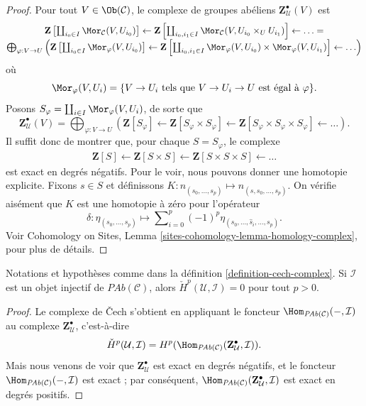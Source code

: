 \begin{proof}
Pour tout $V\in \Ob(\mathcal{C})$, le complexe de groupes ab\'eliens
$\mathbf{Z}_\mathcal{U}^\bullet(V)$ est
$$
\begin{matrix}
\mathbf{Z}\left[
\coprod_{i_0\in I} \Mor_\mathcal{C}(V, U_{i_0})\right]
\leftarrow
\mathbf{Z}\left[
\coprod_{i_0, i_1 \in I}
\Mor_\mathcal{C}(V, U_{i_0} \times_U U_{i_1})\right]
\leftarrow \ldots = \\
\bigoplus_{\varphi : V \to U}
\left(
\mathbf{Z}\left[\coprod_{i_0 \in I} \Mor_\varphi(V, U_{i_0})\right]
\leftarrow
\mathbf{Z}\left[\coprod_{i_0, i_1\in I} \Mor_\varphi(V, U_{i_0}) \times
\Mor_\varphi(V, U_{i_1})\right]
\leftarrow
\ldots
\right)
\end{matrix}
$$
o\`u
$$
\Mor_{\varphi}(V, U_i)
=
\{ V \to U_i \text{ tels que } V \to U_i \to U \text{ est \'egal \`a } \varphi \}.
$$
Posons $S_\varphi = \coprod_{i\in I} \Mor_\varphi(V, U_i)$, de sorte que
$$
\mathbf{Z}_\mathcal{U}^\bullet(V)
=
\bigoplus_{\varphi : V \to U}
\left(
\mathbf{Z}[S_\varphi] \leftarrow
\mathbf{Z}[S_\varphi \times S_\varphi] \leftarrow
\mathbf{Z}[S_\varphi \times S_\varphi \times S_\varphi] \leftarrow
\ldots \right).
$$
Il suffit donc de montrer que, pour chaque $S = S_\varphi$, le complexe
\begin{align*}
\mathbf{Z}[S] \leftarrow
\mathbf{Z}[S \times S] \leftarrow
\mathbf{Z}[S \times S \times S] \leftarrow \ldots
\end{align*}
est exact en degr\'es n\'egatifs. Pour le voir, nous pouvons donner une homotopie explicite.
Fixons $s\in S$ et d\'efinissons $K: n_{(s_0, \ldots, s_p)} \mapsto n_{(s, s_0,
\ldots, s_p)}.$ On v\'erifie ais\'ement que $K$ est une homotopie \`a z\'ero pour l'op\'erateur
$$
\delta :
\eta_{(s_0, \ldots, s_p)}
\mapsto
\sum\nolimits_{i = 0}^p (-1)^p \eta_{(s_0, \ldots, \hat s_i, \ldots, s_p)}.
$$
Voir
Cohomology on Sites, Lemma \ref{sites-cohomology-lemma-homology-complex},
pour plus de d\'etails.
\end{proof}

\begin{lemma}
\label{lemma-hom-injective}
Notations et hypoth\`eses comme dans la d\'efinition \ref{definition-cech-complex}.
Si $\mathcal{I}$ est un objet injectif de $\textit{PAb}(\mathcal{C})$,
alors $\check H^p(\mathcal{U}, \mathcal{I}) = 0$ pour tout $p > 0$.
\end{lemma}

\begin{proof}
Le complexe de {\v C}ech s'obtient en appliquant le foncteur
$\Hom_{\textit{PAb}(\mathcal{C})}(-, \mathcal{I}) $ au complexe $
\mathbf{Z}^\bullet_\mathcal{U} $, c'est-\`a-dire
$$
\check H^p(\mathcal{U}, \mathcal{I}) = H^p
(\Hom_{\textit{PAb}(\mathcal{C})} (\mathbf{Z}^\bullet_\mathcal{U},
\mathcal{I})).
$$
Mais nous venons de voir que $\mathbf{Z}^\bullet_\mathcal{U}$ est exact en
degr\'es n\'egatifs, et le foncteur $\Hom_{\textit{PAb}(\mathcal{C})}(-,
\mathcal{I})$ est exact ; par cons\'equent, $\Hom_{\textit{PAb}(\mathcal{C})}
(\mathbf{Z}^\bullet_\mathcal{U}, \mathcal{I})$ est exact en degr\'es positifs.
\end{proof}

